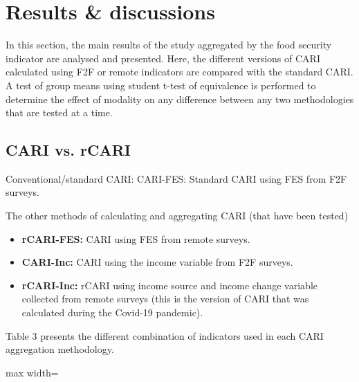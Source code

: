 \documentclass[11pt,harvard]{article}
\begin{document}
	\pagebreak
	
	\section{Results \& discussions}
	
	In this section, the main results of the study aggregated by the food security indicator are analysed and presented. Here, the different versions of CARI calculated using F2F or remote indicators are compared with the standard CARI. A test of group means using student t-test of equivalence is performed to determine the effect of modality on any difference between any two methodologies that are tested at a time. 
	
	\subsection{CARI vs. rCARI}
	
	Conventional/standard CARI:  CARI-FES: Standard CARI using FES from F2F surveys.
	
	The other methods of calculating and aggregating CARI (that have been tested)
	\begin{itemize}[label=--, left=1.5em]
		\item[1.] \textbf{rCARI-FES:} CARI using FES from remote surveys.
		\item[2.] \textbf{CARI-Inc:} CARI using the income variable from F2F surveys.
		\item[3.] \textbf{rCARI-Inc:} rCARI using income source and income change variable collected from remote surveys (this is the version of CARI that was calculated during the Covid-19 pandemic).
	\end{itemize}
	
	Table 3 presents the different combination of indicators used in each CARI aggregation methodology.
	
		\begin{table}[htbp]
		\centering
		\begin{adjustbox} {max width=\textwidth}
			\begin{threeparttable}
				\caption{Matrix of the different aggregation methods and the indicators used for each methodology}
				\scriptsize
				 
				\label{tab:Aggregation_Table}
			\end{threeparttable}
		\end{adjustbox}
	\end{table}
		
\end{document}
